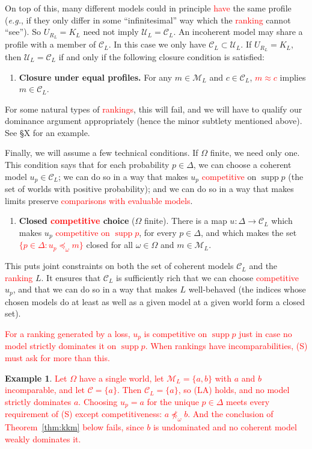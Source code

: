 \documentclass[11pt]{article}
\theoremstyle{definition}
\newtheorem{example}[theorem]{Example}
\theoremstyle{remark}
\newcommand{\M}{\mathcal M}
\newcommand{\C}{\mathcal C}
\newcommand{\U}{\mathcal U}
\newcommand{\supp}{\operatorname{supp}}
\begin{document}
On top of this, many different models could in principle \textcolor{red}{have} the same profile (\textit{e.g.}, if they only differ in some ``infinitesimal'' way which the \textcolor{red}{ranking} cannot ``see''). So $U_{R_L}=K_L$ need not imply $\U_L=\C_L$. An incoherent model may share a profile with a member of $\C_L$. In this case we only have $\C_L\subset \U_L$. If $U_{R_L}=K_L$, then $\U_L=\C_L$ if and only if the following closure condition is satisfied:

\begin{enumerate}[label=\textbf{(C)},leftmargin=*]
\item \textbf{Closure under equal profiles.} For any $m\in \M_L$ and $c\in \C_L$, \textcolor{red}{$m\approx c$} implies $m\in \C_L$.
\end{enumerate}
For some natural types of \textcolor{red}{rankings}, this will fail, and we will have to qualify our dominance argument appropriately (hence the minor subtlety mentioned above). See \S X for an example.


Finally, we will assume a few technical conditions. If $\Omega$ finite, we need only one. This condition says that for each probability $p\in\Delta$, we can choose a coherent model $u_p\in\C_L$; we can do so in a way that makes $u_p$ \textcolor{red}{competitive} on $\supp p$ (the set of worlds with positive probability); and we can do so in a way that makes limits preserve \textcolor{red}{comparisons with evaluable models}.
\begin{enumerate}[label=\textbf{(S)},leftmargin=*]
\item \textbf{Closed \textcolor{red}{competitive} choice} ($\Omega$ finite). There is a map $u:\Delta\to\C_L$ which makes $u_p$ \textcolor{red}{competitive on $\supp p$}, for every $p\in\Delta$, and which makes the set \textcolor{red}{$\{p\in\Delta:u_p\preceq_\omega m\}$} closed for all $\omega\in\Omega$ and $m\in\M_L$.
\end{enumerate}
This puts joint constraints on both the set of coherent models $\C_L$ and the \textcolor{red}{ranking} $L$. It ensures that $\C_L$ is sufficiently rich that we can choose \textcolor{red}{competitive} $u_p$, and that we can do so in a way that makes $L$ well-behaved (the indices whose chosen models do at least as well as a given model at a given world form a closed set).

\textcolor{red}{For a ranking generated by a loss, $u_p$ is competitive on $\supp p$ just in case no model strictly dominates it on $\supp p$. When rankings have incomparabilities, (S) must ask for more than this.}
\begin{example}\label{ex:incomparable}
\textcolor{red}{Let $\Omega$ have a single world, let $\M_L=\{a,b\}$ with $a$ and $b$ incomparable, and let $\C=\{a\}$. Then $\C_L=\{a\}$, so (LA) holds, and no model strictly dominates $a$. Choosing $u_p=a$ for the unique $p\in\Delta$ meets every requirement of (S) except competitiveness: $a\not\preceq_\omega b$. And the conclusion of Theorem~\ref{thm:kkm} below fails, since $b$ is undominated and no coherent model weakly dominates it.}
\end{example}
\end{document}
